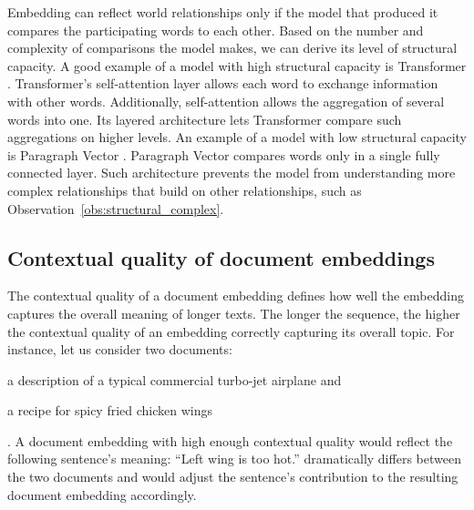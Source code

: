 Embedding can reflect world relationships only if the model that produced it
compares the participating words to each other. Based on the number and
complexity of comparisons the model makes, we can derive its level of
structural capacity. A good example of a model with high structural capacity is
Transformer \citep{vaswani2017attention}. Transformer's self-attention layer
allows each word to exchange information with other words. Additionally,
self-attention allows the aggregation of several words into one. Its layered architecture lets Transformer compare such aggregations
on higher levels. An example of a model with low structural capacity is
Paragraph Vector \citep{le2014distributed}. Paragraph Vector compares words
only in a single fully connected layer. Such architecture prevents the model from
understanding more complex relationships that build on other relationships,
such as Observation~\ref{obs:structural_complex}.

\subsection{Contextual quality of document embeddings}


The contextual quality of a document embedding defines how well the embedding
captures the overall meaning of longer texts. The longer the sequence, the
higher the contextual quality of an embedding correctly
capturing its overall topic. For instance, let us consider two
documents: \begin{enumerate*}
  \item a description of a typical commercial turbo-jet airplane
    and\label{enumitem:plane}
  \item a recipe for spicy fried chicken wings\label{enumitem:chicken}
\end{enumerate*}.
A document embedding with high enough contextual quality would reflect the
following sentence's meaning: ``Left wing is too hot.'' dramatically differs between
the two documents and would adjust the sentence's contribution to
the resulting document embedding accordingly.

